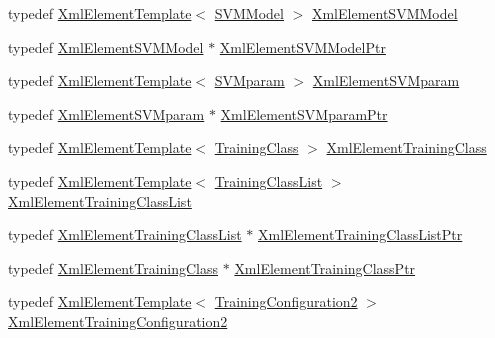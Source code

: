 \begin{DoxyCompactItemize}
\item 
typedef \hyperlink{class_k_k_b_1_1_xml_element_template}{Xml\+Element\+Template}$<$ \hyperlink{class_k_k_m_l_l_1_1_s_v_m_model}{S\+V\+M\+Model} $>$ \hyperlink{namespace_k_k_m_l_l_abd686e81c259a1d4d8433acc9365c62e}{Xml\+Element\+S\+V\+M\+Model}
\item 
typedef \hyperlink{namespace_k_k_m_l_l_abd686e81c259a1d4d8433acc9365c62e}{Xml\+Element\+S\+V\+M\+Model} $\ast$ \hyperlink{namespace_k_k_m_l_l_aec21ceea3afbf36858e47f0fc0dbcd30}{Xml\+Element\+S\+V\+M\+Model\+Ptr}
\item 
typedef \hyperlink{class_k_k_b_1_1_xml_element_template}{Xml\+Element\+Template}$<$ \hyperlink{class_k_k_m_l_l_1_1_s_v_mparam}{S\+V\+Mparam} $>$ \hyperlink{namespace_k_k_m_l_l_a5ddff9706fdda9d572717e645b404bf1}{Xml\+Element\+S\+V\+Mparam}
\item 
typedef \hyperlink{namespace_k_k_m_l_l_a5ddff9706fdda9d572717e645b404bf1}{Xml\+Element\+S\+V\+Mparam} $\ast$ \hyperlink{namespace_k_k_m_l_l_a087a995a76788f9d62f2bf4dde972646}{Xml\+Element\+S\+V\+Mparam\+Ptr}
\item 
typedef \hyperlink{class_k_k_b_1_1_xml_element_template}{Xml\+Element\+Template}$<$ \hyperlink{class_k_k_m_l_l_1_1_training_class}{Training\+Class} $>$ \hyperlink{namespace_k_k_m_l_l_a0f118c0155cb57cdd78c2bb6e7536353}{Xml\+Element\+Training\+Class}
\item 
typedef \hyperlink{class_k_k_b_1_1_xml_element_template}{Xml\+Element\+Template}$<$ \hyperlink{class_k_k_m_l_l_1_1_training_class_list}{Training\+Class\+List} $>$ \hyperlink{namespace_k_k_m_l_l_a85138db21d7188e00294cfc7cbbba814}{Xml\+Element\+Training\+Class\+List}
\item 
typedef \hyperlink{namespace_k_k_m_l_l_a85138db21d7188e00294cfc7cbbba814}{Xml\+Element\+Training\+Class\+List} $\ast$ \hyperlink{namespace_k_k_m_l_l_a8ae9fd07b357de52682cd901474fd163}{Xml\+Element\+Training\+Class\+List\+Ptr}
\item 
typedef \hyperlink{namespace_k_k_m_l_l_a0f118c0155cb57cdd78c2bb6e7536353}{Xml\+Element\+Training\+Class} $\ast$ \hyperlink{namespace_k_k_m_l_l_ad7b832063ec35b235e0f6523678a4fc1}{Xml\+Element\+Training\+Class\+Ptr}
\item 
typedef \hyperlink{class_k_k_b_1_1_xml_element_template}{Xml\+Element\+Template}$<$ \hyperlink{class_k_k_m_l_l_1_1_training_configuration2}{Training\+Configuration2} $>$ \hyperlink{namespace_k_k_m_l_l_a959ad458aebdb6b8716a6946c6d0f720}{Xml\+Element\+Training\+Configuration2}
\item 

\end{DoxyCompactItemize}
